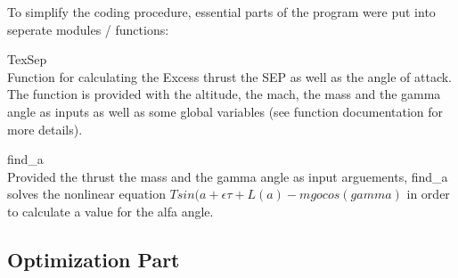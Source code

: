 \noindent To simplify the coding procedure, essential parts of the program were put into seperate modules / functions:
\begin{description*}
    \item[TexSep] \hfill \\
        Function for calculating the Excess thrust the SEP as well as the angle of attack. The function
        is provided with the altitude, the mach, the mass and the gamma angle as inputs as well as some global variables
        (see function documentation for more details).
    \item[find\_a] \hfill \\
        Provided the thrust the mass and the gamma angle as input arguements, find\_a
        solves the nonlinear equation $Tsin(a + \epsilon{\tau} + L(a) - mgocos(gamma)$ 
        in order to calculate a value for the alfa angle.
\end{description*}

\subsection{Optimization Part}
